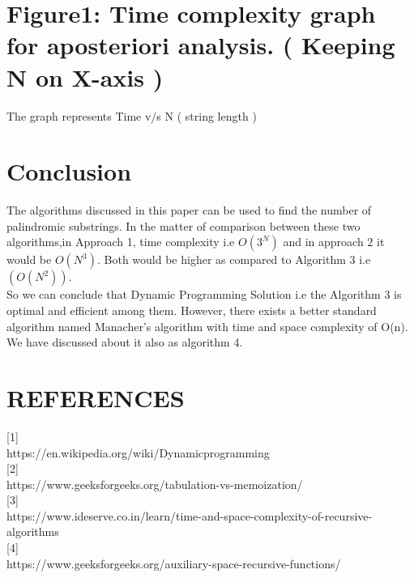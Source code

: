 \documentclass[conference]{IEEEtran}
\begin{document}

\section*{Figure1: Time complexity graph for aposteriori analysis. ( Keeping N on X-axis )
}

The graph represents Time v/s N ( string length )\\
\bigskip




\section{Conclusion}
The algorithms discussed in this paper can be used to find the number of palindromic substrings. In the matter of comparison between these two algorithms,in Approach 1, time complexity i.e \( O(3^N) \) and in approach 2 it would be \( O(N^3) \). Both would be higher as compared to Algorithm 3 i.e  \( (O(N^2)). \)\\
So we can conclude that Dynamic Programming Solution i.e the Algorithm 3 is optimal and efficient among them.
However, there exists a better standard algorithm named Manacher’s algorithm with time and space complexity of O(n). We have discussed about it also as algorithm 4.

\bigskip


\section{REFERENCES}

\bigskip

[1] \\
https://en.wikipedia.org/wiki/Dynamic\textunderscore programming\\

[2] \\
https://www.geeksforgeeks.org/tabulation-vs-memoization/ \\

[3] \\
https://www.ideserve.co.in/learn/time-and-space-complexity-of-recursive-algorithms\\

[4] \\
https://www.geeksforgeeks.org/auxiliary-space-recursive-functions/
\end{document}
